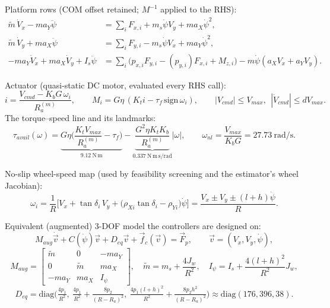 \documentclass[11pt]{article}
\begin{document}
Platform rows (COM offset retained; $M^{-1}$ applied to the RHS):
\begin{align}
\tilde m\,\dot V_x - ma_Y\ddot\psi &= \textstyle\sum_i F_{x,i} + m_s\dot\psi V_y + m a_X\dot\psi^2,\\
\tilde m\,\dot V_y + ma_X\ddot\psi &= \textstyle\sum_i F_{y,i} - m_s\dot\psi V_x + m a_Y\dot\psi^2,\\
-ma_Y\dot V_x + ma_X\dot V_y + I_s\ddot\psi &= \textstyle\sum_i\big(p_{x,i}F_{y,i}-(p_{y,i})F_{x,i}+M_{z,i}\big)
 - m\dot\psi(a_XV_x+a_YV_y).
\end{align}

Actuator (quasi-static DC motor, evaluated every RHS call):
\begin{equation}
i=\frac{V_{cmd}-K_bG\,\omega_i}{R_a^{(m)}},\qquad
M_i=G\eta\,(K_t i-\tau_f\,\mathrm{sign}\,\omega_i),
\qquad |V_{cmd}|\le V_{max},\ \ |\dot V_{cmd}|\le dV_{max}.
\label{eq:motormap-app}
\end{equation}
The torque--speed line and its landmarks:
\begin{equation}
\tau_{avail}(\omega)=\underbrace{G\eta\Big(\frac{K_tV_{max}}{R_a^{(m)}}-\tau_f\Big)}_{9.12\ \mathrm{N\,m}}
-\underbrace{\frac{G^2\eta K_tK_b}{R_a^{(m)}}}_{0.337\ \mathrm{N\,m\,s/rad}}|\omega|,
\qquad \omega_{nl}=\frac{V_{max}}{K_bG}=27.73\ \mathrm{rad/s}.
\label{eq:tauavail-app}
\end{equation}

No-slip wheel-speed map (used by feasibility screening and the estimator's wheel
Jacobian):
\begin{equation}
\omega_i=\frac{1}{R}\Big[V_x+\tan\delta_i\,V_y+\big(\rho_{Xi}\tan\delta_i-\rho_{Yi}\big)\dot\psi\Big]
=\frac{V_x\pm V_y\pm(l+h)\dot\psi}{R}.
\label{eq:wheelmap-app}
\end{equation}

Equivalent (augmented) 3-DOF model the controllers are designed on:
\begin{equation}
M_{aug}\dot{\vec v}+C(\dot\psi)\vec v+D_{eq}\vec v+\vec f_c(\vec v)=\vec F_p,\qquad
\vec v=(V_x,V_y,\dot\psi),
\end{equation}
\begin{equation}
M_{aug}=\begin{bmatrix}\tilde m&0&-ma_Y\\0&\tilde m&ma_X\\-ma_Y&ma_X&I_\psi\end{bmatrix},\quad
\tilde m=m_s+\frac{4J_w}{R^2},\quad I_\psi=I_s+\frac{4(l+h)^2}{R^2}J_w,
\end{equation}
\begin{equation}
D_{eq}=\mathrm{diag}\Big(\tfrac{4p_1}{R^2},\
\tfrac{4p_1}{R^2}+\tfrac{8p_2}{(R-R_a)^2},\
\tfrac{4p_1(l+h)^2}{R^2}+\tfrac{8p_2h^2}{(R-R_a)^2}\Big)\approx\mathrm{diag}(176,396,38).
\end{equation}
\end{document}
